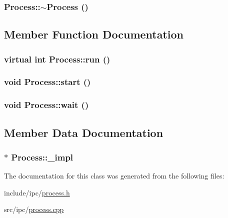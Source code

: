 \hypertarget{classProcess_990776d181dbbde7ff8ac12713d814b3}{
\subsubsection[{$\sim$Process}]{\setlength{\rightskip}{0pt plus 5cm}Process::$\sim$Process ()}}
\label{classProcess_990776d181dbbde7ff8ac12713d814b3}




\subsection{Member Function Documentation}
\hypertarget{classProcess_44aa79a79a8892c219b99582066530da}{
\subsubsection[{run}]{\setlength{\rightskip}{0pt plus 5cm}virtual int Process::run ()}}
\label{classProcess_44aa79a79a8892c219b99582066530da}


\hypertarget{classProcess_3fd7a51f79da17509af20d18a43c2f04}{
\subsubsection[{start}]{\setlength{\rightskip}{0pt plus 5cm}void Process::start ()}}
\label{classProcess_3fd7a51f79da17509af20d18a43c2f04}


\hypertarget{classProcess_3207d2d467391c0641eb3062b5d3a7d7}{
\subsubsection[{wait}]{\setlength{\rightskip}{0pt plus 5cm}void Process::wait ()}}
\label{classProcess_3207d2d467391c0641eb3062b5d3a7d7}




\subsection{Member Data Documentation}
\hypertarget{classProcess_8c1b2d11edde0fd78ece00c98f96155f}{
\subsubsection[{\_\-impl}]{$\ast$ {\bf Process::\_\-impl}}}
\label{classProcess_8c1b2d11edde0fd78ece00c98f96155f}




The documentation for this class was generated from the following files:\begin{CompactItemize}
\item 
include/ipc/\hyperlink{process_8h}{process.h}\item 
src/ipc/\hyperlink{process_8cpp}{process.cpp}\end{CompactItemize}
